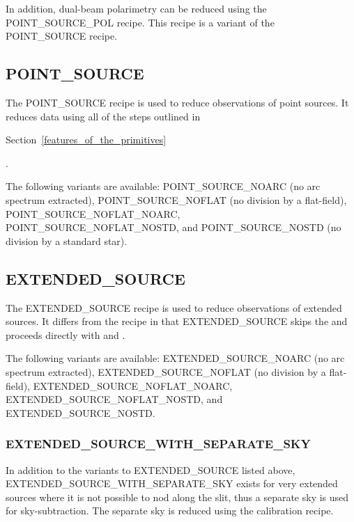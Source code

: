\documentclass[twoside,11pt,nolof]{starlink}
\begin{document}
In addition, dual-beam polarimetry can be reduced using the POINT\_SOURCE\_POL recipe. This recipe is a variant of the POINT\_SOURCE recipe.

\subsection{POINT\_SOURCE\label{point_source}}

The POINT\_SOURCE recipe is used to reduce observations of point sources. It reduces data using all of the steps outlined in
\begin{latexonly}
Section~\ref{features_of_the_primitives}
\end{latexonly}


.

The following variants are available: POINT\_SOURCE\_NOARC (no arc spectrum extracted), POINT\_SOURCE\_NOFLAT (no division by a flat-field), POINT\_SOURCE\_NOFLAT\_NOARC, POINT\_SOURCE\_NOFLAT\_NOSTD, and POINT\_SOURCE\_NOSTD (no division by a standard star).

\subsection{EXTENDED\_SOURCE\label{extended_source}}

The EXTENDED\_SOURCE recipe is used to reduce observations of extended sources. It differs from
the  recipe
in that EXTENDED\_SOURCE skips the 
and proceeds directly with
and
.

The following variants are available: EXTENDED\_SOURCE\_NOARC (no arc spectrum extracted), EXTENDED\_SOURCE\_NOFLAT (no division by a flat-field), EXTENDED\_SOURCE\_NOFLAT\_NOARC, EXTENDED\_SOURCE\_NOFLAT\_NOSTD, and EXTENDED\_SOURCE\_NOSTD.

\subsubsection{EXTENDED\_SOURCE\_WITH\_SEPARATE\_SKY\label{extended_source_with_separate_sky}}

In addition to the variants to EXTENDED\_SOURCE listed above,
EXTENDED\_SOURCE\_WITH\_SEPARATE\_SKY exists for very extended sources
where it is not possible to nod along the slit, thus a separate sky is
used for sky-subtraction. The separate sky is reduced using the
 calibration recipe.
\end{document}
